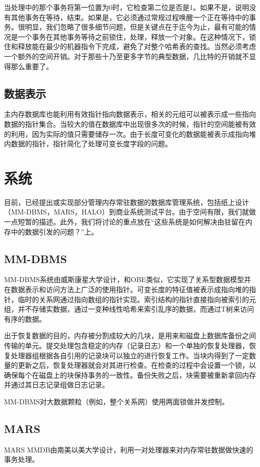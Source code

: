 \documentclass[translation]{zjutreport}
\begin{document}
当处理中的那个事务将第一位置为0时，它检查第二位是否是1。如果不是，说明没有其他事务在等待，结束。如果是，它必须通过常规过程唤醒一个正在等待中的事务。很明显，我们忽略了很多细节问题，但是关键点在于迄今为止，最有可能的情况是一个事务在其他事务等待之前锁住，处理，释放一个对象。在这种情况下，锁住和释放能在最少的机器指令下完成，避免了对整个哈希表的查找。当然必须考虑一个额外的空间开销。对于那些十乃至更多字节的典型数据，几比特的开销就不显得那么重要了。

\section{数据表示}
主内存数据库也能利用有效指针指向数据表示，相关的元组可以被表示成一些指向数据的指针集合。当较大的值在数据库中出现很多次的时候，指针的空间能被有效的利用，因为实际的值只需要储存一次。由于长度可变化的数据能被表示成指向堆内数据的指针，指针简化了处理可变长度字段的问题。

\chapter{系统}
目前，已经提出或实现部分管理内存常驻数据的数据库管理系统，包括纸上设计（MM-DBMS，MARS，HALO）到商业系统测试平台。由于空间有限，我们就做一点短暂的描述。此外，我们将讨论的重点放在“这些系统是如何解决由驻留在内存中的数据引发的问题？”上。

\section{MM-DBMS}
MM-DBMS系统由威斯康星大学设计，和OBE类似，它实现了关系型数据模型并在数据表示和访问方法上广泛的使用指针。可变长度的特征值被表示成指向堆的指针，临时的关系网通过指向数组的指针实现。索引结构的指针直接指向被索引的元组，并不存储实数据，通过一变种线性哈希来索引乱序的数据，而通过T树来访问有序的数据。

出于恢复数据的目的，内存被分割成较大的几块，是用来和磁盘上数据库备份之间传输的单元。提交处理包含稳定的内存（记录日志）和一个单独的恢复处理器，恢复处理器组根据各自引用的记录块可以独立的进行恢复工作。当块内得到了一定数量的更新之后，恢复处理器就会对其进行检查。在检查的过程中会设置一个锁，以确保每个在磁盘上的块保持事务的一致性。备份失败之后，块需要被重新拿回内存并通过其日志记录组做日志记录。

MM-DBMS对大数据颗粒（例如，整个关系网）使用两面锁做并发控制。

\section{MARS}
MARS MMDB由南美以美大学设计，利用一对处理器来对内存常驻数据做快速的事务处理。
\end{document}
